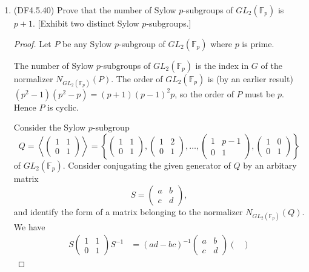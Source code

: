 \documentclass[11pt]{article}
\newcommand{\br}[1]{\left(#1\right)}
\newcommand{\cbr}[1]{\left\{#1\right\}}
\begin{document}
\begin{enumerate}
    \item (DF4.5.40) Prove that the number of Sylow $p$-subgroups of $GL_2(\mathbb{F}_p)$ is $p+1$. [Exhibit two distinct Sylow $p$-subgroups.]
    \begin{proof}
      Let $P$ be any Sylow $p$-subgroup of $GL_2(\mathbb{F}_p)$ where $p$ is prime. 

      The number of Sylow $p$-subgroups of $GL_2(\mathbb{F}_p)$ is the index in $G$ of the normalizer $N_{GL_2(\mathbb{F}_p)}(P)$. The order of $GL_2(\mathbb{F}_p)$ is (by an earlier result) $(p^2-1)(p^2-p) = (p+1)(p-1)^2p$, so the order of $P$ must be $p$. Hence $P$ is cyclic.

      Consider the Sylow $p$-subgroup
      \[Q = \left\langle \begin{pmatrix}
        1 & 1 \\ 0 & 1
      \end{pmatrix} \right\rangle = \cbr{\begin{pmatrix}
        1 & 1 \\ 0 & 1
      \end{pmatrix}, \begin{pmatrix}
        1 & 2 \\ 0 & 1
      \end{pmatrix}, \dots, \begin{pmatrix}
        1 & p-1 \\ 0 & 1
      \end{pmatrix}, \begin{pmatrix}
        1 & 0 \\ 0 & 1
      \end{pmatrix}}\]
      of $GL_2(\mathbb{F}_p)$. Consider conjugating the given generator of $Q$ by an arbitary matrix \[S = \begin{pmatrix}
        a & b \\ c & d
      \end{pmatrix},\] and identify the form of a matrix belonging to the normalizer $N_{GL_2(\mathbb{F}_p)}(Q)$. We have \begin{align*}
        S\begin{pmatrix}
          1 & 1 \\ 0 & 1
        \end{pmatrix}S^{-1} &= \br{ad-bc}^{-1}\begin{pmatrix}
          a & b \\ c & d
        \end{pmatrix}\begin{pmatrix}

\end{pmatrix}
\end{align*}
\end{proof}
\end{enumerate}
\end{document}
